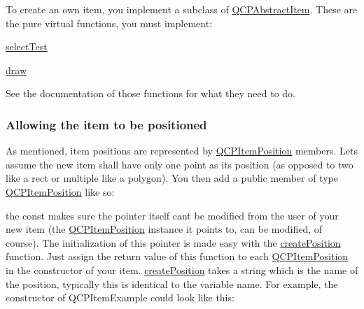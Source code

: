 To create an own item, you implement a subclass of \mbox{\hyperlink{class_q_c_p_abstract_item}{Q\+C\+P\+Abstract\+Item}}. These are the pure virtual functions, you must implement\+: \begin{DoxyItemize}
\item \mbox{\hyperlink{class_q_c_p_abstract_item_ae41d0349d68bb802c49104afd100ba2a}{select\+Test}} \item \mbox{\hyperlink{class_q_c_p_abstract_item_a007fdab79c935a5da5aa04a21d268c18}{draw}}\end{DoxyItemize}
See the documentation of those functions for what they need to do.\hypertarget{class_q_c_p_abstract_item_items-positioning}{}\subsubsection{Allowing the item to be positioned}\label{class_q_c_p_abstract_item_items-positioning}
As mentioned, item positions are represented by \mbox{\hyperlink{class_q_c_p_item_position}{Q\+C\+P\+Item\+Position}} members. Let\textquotesingle{}s assume the new item shall have only one point as its position (as opposed to two like a rect or multiple like a polygon). You then add a public member of type \mbox{\hyperlink{class_q_c_p_item_position}{Q\+C\+P\+Item\+Position}} like so\+:


\begin{DoxyCode}{0}
\end{DoxyCode}


the const makes sure the pointer itself can\textquotesingle{}t be modified from the user of your new item (the \mbox{\hyperlink{class_q_c_p_item_position}{Q\+C\+P\+Item\+Position}} instance it points to, can be modified, of course). The initialization of this pointer is made easy with the \mbox{\hyperlink{class_q_c_p_abstract_item_a75036d39c4d4e2e1a7dd145fff915d32}{create\+Position}} function. Just assign the return value of this function to each \mbox{\hyperlink{class_q_c_p_item_position}{Q\+C\+P\+Item\+Position}} in the constructor of your item. \mbox{\hyperlink{class_q_c_p_abstract_item_a75036d39c4d4e2e1a7dd145fff915d32}{create\+Position}} takes a string which is the name of the position, typically this is identical to the variable name. For example, the constructor of Q\+C\+P\+Item\+Example could look like this\+:


